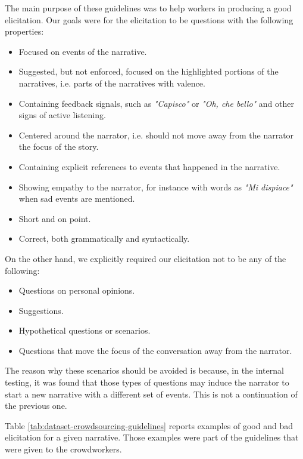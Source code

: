The main purpose of these guidelines was to help workers in producing a good elicitation. Our goals were for the elicitation to be questions with the following properties:
\begin{itemize}
    \item Focused on events of the narrative.
    \item Suggested, but not enforced, focused on the highlighted portions of the narratives, i.e. parts of the narratives with valence.
    \item Containing feedback signals, such as \emph{"Capisco"} or \emph{"Oh, che bello"} and other signs of active listening.
    \item Centered around the narrator, i.e. should not move away from the narrator the focus of the story.
    \item Containing explicit references to events that happened in the narrative.
    \item Showing empathy to the narrator, for instance with words as \emph{"Mi dispiace"} when sad events are mentioned.
    \item Short and on point.
    \item Correct, both grammatically and syntactically.
\end{itemize}
On the other hand, we explicitly required our elicitation not to be any of the following:
\begin{itemize}
    \item Questions on personal opinions.
    \item Suggestions.
    \item Hypothetical questions or scenarios.
    \item Questions that move the focus of the conversation away from the narrator.
\end{itemize}
The reason why these scenarios should be avoided is because, in the internal testing, it was found that those types of questions may induce the narrator to start a new narrative with a different set of events. This is not a continuation of the previous one. 

Table \ref{tab:dataset-crowdsourcing-guidelines} reports examples of good and bad elicitation for a given narrative. Those examples were part of the guidelines that were given to the crowdworkers.
